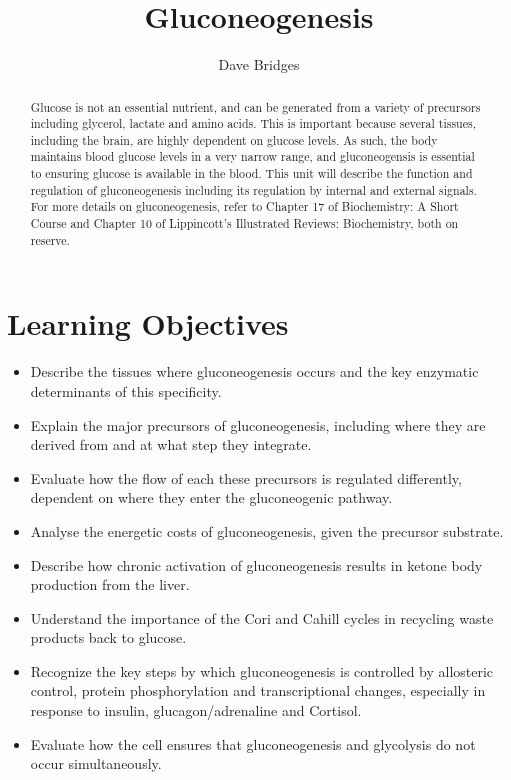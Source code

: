 \documentclass{tufte-handout}
\title{Gluconeogenesis}
\author{Dave Bridges}
\begin{document}
\maketitle%

\begin{abstract}
\noindent Glucose is not an essential nutrient, and can be generated from a variety of precursors including glycerol, lactate and amino acids.  This is important because several tissues, including the brain, are highly dependent on glucose levels.  As such, the body maintains blood glucose levels in a very narrow range, and gluconeogensis is essential to ensuring glucose is available in the blood.  This unit will describe the function and regulation of gluconeogenesis including its regulation by internal and external signals.  For more details on gluconeogenesis, refer to Chapter 17 of Biochemistry: A Short Course\cite{Berg2015} and Chapter 10 of Lippincott's Illustrated Reviews: Biochemistry\cite{Ferrier2017}, both on reserve.
\end{abstract}

\tableofcontents
\pagebreak{}
\section{Learning Objectives}

\begin{itemize}
\item Describe the tissues where gluconeogenesis occurs and the key enzymatic determinants of this specificity.
\item Explain the major precursors of gluconeogenesis, including where they are derived from and at what step they integrate.
\item Evaluate how the flow of each these precursors is regulated differently, dependent on where they enter the gluconeogenic pathway.
\item Analyse the energetic costs of gluconeogenesis, given the precursor substrate.
\item Describe how chronic activation of gluconeogenesis results in ketone body production from the liver.
\item Understand the importance of the Cori and Cahill cycles in recycling waste products back to glucose.
\item Recognize the key steps by which gluconeogenesis is controlled by allosteric control, protein phosphorylation and transcriptional changes, especially in response to insulin, glucagon/adrenaline and Cortisol.
\item Evaluate how the cell ensures that gluconeogenesis and glycolysis do not occur simultaneously.
\end{itemize}
\end{document}
